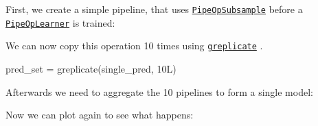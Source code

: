 \documentclass[]{article}
\newenvironment{Shaded}{}{}
\newcommand{\CommentTok}[1]{\textcolor[rgb]{0.00,0.50,0.00}{#1}}
\newcommand{\DataTypeTok}[1]{#1}
\newcommand{\FloatTok}[1]{#1}
\newcommand{\KeywordTok}[1]{\textcolor[rgb]{0.00,0.00,1.00}{#1}}
\newcommand{\NormalTok}[1]{#1}
\newcommand{\OperatorTok}[1]{#1}
\newcommand{\OtherTok}[1]{\textcolor[rgb]{1.00,0.25,0.00}{#1}}
\newcommand{\StringTok}[1]{\textcolor[rgb]{0.00,0.50,0.50}{#1}}
\renewenvironment{Shaded} {\begin{snugshade}\small} {\end{snugshade}}
\begin{document}
First, we create a simple pipeline, that uses \href{https://mlr3pipelines.mlr-org.com/reference/mlr_pipeops_subsample.html}{\texttt{PipeOpSubsample}} before a \href{https://mlr3pipelines.mlr-org.com/reference/mlr_pipeops_learner.html}{\texttt{PipeOpLearner}} is trained:

\begin{Shaded}
\end{Shaded}

We can now copy this operation 10 times using \href{https://mlr3pipelines.mlr-org.com/reference/greplicate.html}{\texttt{greplicate}} .

\begin{Shaded}
\begin{Highlighting}[]
\NormalTok{pred_set =}\StringTok{ }\KeywordTok{greplicate}\NormalTok{(single_pred, 10L)}
\end{Highlighting}
\end{Shaded}

Afterwards we need to aggregate the 10 pipelines to form a single model:

\begin{Shaded}
\end{Shaded}

Now we can plot again to see what happens:

\begin{Shaded}
\end{Shaded}
\end{document}
